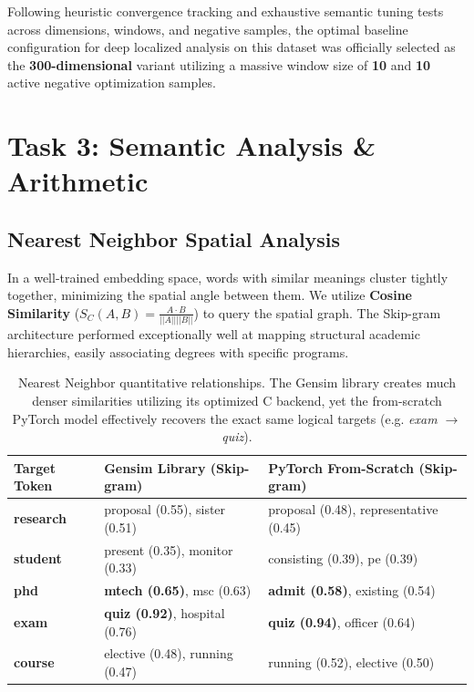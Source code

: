 \documentclass[11pt,a4paper]{article}
\begin{document}
\begin{infoBox}
Following heuristic convergence tracking and exhaustive semantic tuning tests across dimensions, windows, and negative samples, the optimal baseline configuration for deep localized analysis on this dataset was officially selected as the \textbf{300-dimensional} variant utilizing a massive window size of \textbf{10} and \textbf{10} active negative optimization samples.
\end{infoBox}

\clearpage
\section{Task 3: Semantic Analysis \& Arithmetic}

\subsection{Nearest Neighbor Spatial Analysis}
In a well-trained embedding space, words with similar meanings cluster tightly together, minimizing the spatial angle between them. We utilize \textbf{Cosine Similarity} ($S_C(A,B) = \frac{A \cdot B}{||A|| ||B||}$) to query the spatial graph. The Skip-gram architecture performed exceptionally well at mapping structural academic hierarchies, easily associating degrees with specific programs.

\begin{table}[H]
    \centering
    \renewcommand{\arraystretch}{1.4} %
    \begin{tabular}{@{} p{2.0cm} p{6.5cm} p{6.5cm} @{}}
        \toprule
        \textbf{\color{iitjblue} Target Token} & \textbf{\color{iitjblue} Gensim Library (Skip-gram)} & \textbf{\color{iitjblue} PyTorch From-Scratch (Skip-gram)} \\
        \midrule
        \textbf{research} & proposal (0.55), sister (0.51) & proposal (0.48), representative (0.45) \\
        \rowcolor{black!5} \textbf{student} & present (0.35), monitor (0.33) & consisting (0.39), pe (0.39) \\
        \textbf{phd} & \textcolor{accentgreen}{\textbf{mtech (0.65)}}, msc (0.63) & \textcolor{accentgreen}{\textbf{admit (0.58)}}, existing (0.54) \\
        \rowcolor{black!5} \textbf{exam} & \textcolor{accentgreen}{\textbf{quiz (0.92)}}, hospital (0.76) & \textcolor{accentgreen}{\textbf{quiz (0.94)}}, officer (0.64) \\
        \textbf{course} & elective (0.48), running (0.47) & running (0.52), elective (0.50) \\
        \bottomrule
    \end{tabular}
    \vspace{0.5em}
    \caption{Nearest Neighbor quantitative relationships. The Gensim library creates much denser similarities utilizing its optimized C backend, yet the from-scratch PyTorch model effectively recovers the exact same logical targets (e.g. \textit{exam $\rightarrow$ quiz}).}
    \label{tab:neighbors}
\end{table}
\end{document}
